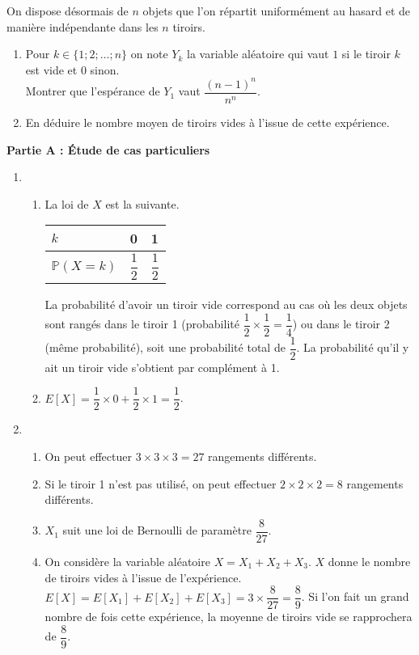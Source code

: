 \documentclass[11pt,fleqn, openany]{book} %
\begin{document}
\begin{exercise}[topic=lgn02]
On dispose désormais de $n$ objets que l'on répartit uniformément au hasard et de manière indépendante dans les $n$ tiroirs.
\begin{enumerate}
\item Pour $k \in \{ 1 ; 2 ; \ldots ; n\}$ on note $Y_k$ la variable aléatoire qui vaut $1$ si le tiroir $k$ est vide et 0 sinon. \\ Montrer que l'espérance de $Y_1$ vaut $\dfrac{(n-1)^n}{n^n}$.
\item En déduire le nombre moyen de tiroirs vides à l'issue de cette expérience. 
\end{enumerate}\end{exercise}


\begin{solution}
\textbf{Partie A : Étude de cas particuliers}

\begin{enumerate}
\item 

\begin{enumerate}
\item La loi de $X$ est la suivante.

\begin{tabularx}{0.5\linewidth}{|X|X|X|}
\hline
$k$ & 0 & 1 \\
\hline
$\mathbb{P}(X=k)$ & $\dfrac{1}{2}$ & $\dfrac{1}{2}$\\
\hline
\end{tabularx}

La probabilité d'avoir un tiroir vide correspond au cas où les deux objets sont rangés dans le tiroir 1 (probabilité $\dfrac{1}{2} \times \dfrac{1}{2} = \dfrac{1}{4}$) ou dans le tiroir 2 (même probabilité), soit une probabilité total de $\dfrac{1}{2}$. La probabilité qu'il y ait un tiroir vide s'obtient par complément à 1.

\item $E[X]=\dfrac{1}{2} \times 0 + \dfrac{1}{2} \times 1 = \dfrac{1}{2}$.
\end{enumerate}
\item 
\begin{enumerate}
\item On peut effectuer $3 \times 3 \times 3 = 27$ rangements différents.
\item Si le tiroir 1 n'est pas utilisé, on peut effectuer $2 \times 2 \times 2 = 8$ rangements différents.
\item $X_1$ suit une loi de Bernoulli de paramètre $\dfrac{8}{27}$.
\item On considère la variable aléatoire $X=X_1+X_2+X_3$.  $X$ donne le nombre de tiroirs vides à l'issue de l'expérience. $E[X]=E[X_1]+E[X_2]+E[X_3] = 3 \times \dfrac{8}{27}=\dfrac{8}{9}$. Si l'on fait un grand nombre de fois cette expérience, la moyenne de tiroirs vide se rapprochera de $\dfrac{8}{9}$.
\end{enumerate}
\end{enumerate}


\end{solution}
\end{document}
